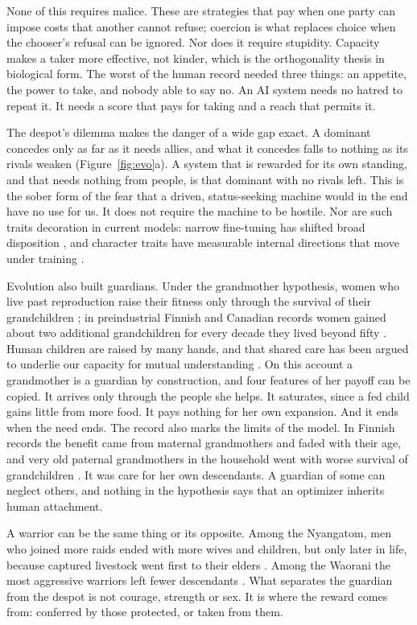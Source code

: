 \documentclass[10pt,twocolumn]{article}
\theoremstyle{plain}
\theoremstyle{definition}
\begin{document}
None of this requires malice. These are strategies that pay when one party can impose costs
that another cannot refuse; coercion is what replaces choice when the chooser's refusal can
be ignored. Nor does it require stupidity. Capacity makes a taker more effective, not kinder,
which is the orthogonality thesis \cite{bostrom2012} in biological form. The worst of the
human record needed three things: an appetite, the power to take, and nobody able to say no.
An AI system needs no hatred to repeat it. It needs a score that pays for taking and a reach
that permits it.

The despot's dilemma makes the danger of a wide gap exact. A dominant concedes only as far as
it needs allies, and what it concedes falls to nothing as its rivals weaken
(Figure~\ref{fig:evo}a). A system that is rewarded for its own standing, and that needs
nothing from people, is that dominant with no rivals left. This is the sober form of the fear
that a driven, status-seeking machine would in the end have no use for us. It does not
require the machine to be hostile. Nor are such traits decoration in current models: narrow
fine-tuning has shifted broad disposition \cite{betley2025}, and character traits have
measurable internal directions that move under training \cite{chen2025persona}.

Evolution also built guardians. Under the grandmother hypothesis, women who live past
reproduction raise their fitness only through the survival of their grandchildren
\cite{hawkes1998}; in preindustrial Finnish and Canadian records women gained about two
additional grandchildren for every decade they lived beyond fifty \cite{lahdenpera2004}.
Human children are raised by many hands, and that shared care has been argued to underlie our
capacity for mutual understanding \cite{hrdy2009}. On this account a grandmother is a
guardian by construction, and four features of her payoff can be copied. It arrives only
through the people she helps. It saturates, since a fed child gains little from more food. It
pays nothing for her own expansion. And it ends when the need ends. The record also marks the
limits of the model. In Finnish records the benefit came from maternal grandmothers and
faded with their age, and very old paternal grandmothers in the household went with worse
survival of grandchildren \cite{chapman2019}. It was care for her own descendants. A
guardian of some can neglect others, and nothing in the hypothesis says that an optimizer
inherits human attachment.

A warrior can be the same thing or its opposite. Among the Nyangatom, men who joined more
raids ended with more wives and children, but only later in life, because captured livestock
went first to their elders \cite{glowacki2015}. Among the Waorani the most aggressive warriors
left fewer descendants \cite{beckerman2009}. What separates the guardian from the despot is
not courage, strength or sex. It is where the reward comes from: conferred by those
protected, or taken from them.
\end{document}
